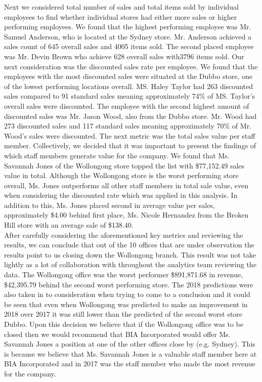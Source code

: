 \documentclass{article}
\begin{document}
    Next we considered total number of sales and total items sold by individual employees 
    to find whether individual stores had either more sales or higher performing employees.  
    We found that the highest performing employee was Mr.  Samuel Anderson, who is located 
    at the Sydney store.  Mr.  Anderson achieved a sales count of 645 overall sales and 
    4005 items sold.  The second placed employee was Mr.  Devin Brown who achieve 628 overall sales with3796 items sold.  Our next consideration was the discounted sales rate per employee.  
    We found that the employees with the most discounted sales were situated at the 
    Dubbo store, one of the lowest performing locations overall. MS.   Haley  Taylor  
    had  263  discounted  sales  compared  to  91  standard  sales  meaning  approximately  
    74\%  of  MS. Taylor’s overall sales were discounted.  The employee with the second 
    highest amount of discounted sales was Mr. Jason Wood,  also from the Dubbo store.  
    Mr.  Wood had 273 discounted sales and 117 standard sales meaning approximately  
    70\%  of  Mr.   Wood’s  sales  were  discounted.   
    The  next  metric  was  the  total  sales  value  per  staff member.  
    Collectively, we decided that it was important to present the findings of which 
    staff members generate value for the company.  We found that Ms.  Savannah Jones 
    of the Wollongong store topped the list with \$77,152.49 sales value in total.  
    Although the Wollongong store is the worst performing store overall, Ms.  Jones 
    outperforms all other staff members in total sale value, even when considering 
    the discounted rate which was applied in this analysis.  In addition to this, Ms.  
    Jones placed second in average value per sales, approximately \$4.00 behind first 
    place, Ms.  Nicole Hernandez from the Broken Hill store with an average sale of \$138.40.\\

    After carefully considering the aforementioned key metrics and reviewing the results, 
    we can conclude that out of the 10 offices that are under observation the results 
    point to us closing down the Wollongong branch. This result was not take lightly as 
    a lot of collaboration with throughout the analytics team reviewing the data. The 
    Wollongong office was the worst performer \$891,871.68 in revenue, \$42,395.79 behind 
    the second worst performing  store. The 2018 predictions were also taken in to consideration 
    when trying to come to a conclusion and it could be seen that even when Wollongong was 
    predicted to make an improvement in 2018 over 2017 it was still lower than the predicted 
    of the second worst store Dubbo. Upon this decision we believe that if the Wollongong 
    office was to be closed then we would recommend that BIA Incorporated would offer Ms.  
    Savannah Jones a position at one of the other offices close by (e.g. Sydney). 
    This is because we believe that Ms.  Savannah Jones is a valuable staff member here at 
    BIA Incorporated  and in 2017 was the staff member who made the most revenue for the company.
\end{document}
